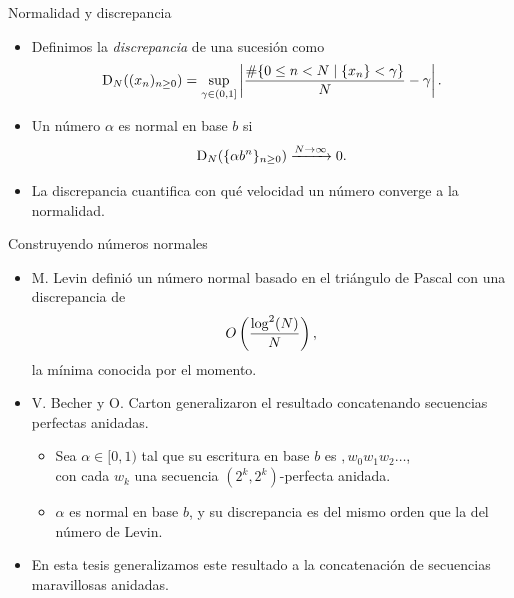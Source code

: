\documentclass[spanish,xcolor={table}]{beamer}
\begin{document}

\begin{frame}{Normalidad y discrepancia}

  \begin{itemize}
    \item Definimos la \emph{discrepancia} de una sucesión como
    \[
      \operatorname{D}_{N}((x_n)_{n \geq 0})
      = \sup_{\gamma \in (0,1]} \left\vert
        \frac{\# \lbrace 0 \leq n < N \;\vert\; \lbrace x_n \rbrace < \gamma \rbrace}
        {N} - \gamma
      \right\vert.
    \]
    \item Un número $\alpha$ es normal en base $b$ si
    \[ \operatorname{D}_{N}(\lbrace \alpha b^n \rbrace_{n\geq0})
    \xrightarrow{N \to \infty} 0. \]
    \item La discrepancia cuantifica con qué velocidad un número converge a
    la normalidad.
  \end{itemize}

\end{frame}


\begin{frame}{Construyendo números normales}
  \begin{itemize}
    \item M. Levin definió un número normal basado en el triángulo de Pascal
    con una discrepancia de
    \[ O \left(\frac{\log^2(N)}{N}\right), \]
    la mínima conocida por el momento.
    \pause
    \item V. Becher y O. Carton generalizaron el resultado concatenando
    secuencias perfectas anidadas.
    \begin{itemize}
      \item Sea $\alpha \in [0, 1)$ tal que su escritura en base $b$ es ${,}w_0 w_1 w_2 \dots$, \\ con cada $w_k$ una secuencia $(2^k,2^k)$-perfecta anidada.
      \item $\alpha$ es normal en base $b$,
      y su discrepancia es del mismo orden que la del número de Levin.
    \end{itemize}
    \pause
    \item En esta tesis generalizamos este resultado a la concatenación
    de secuencias maravillosas anidadas.
  \end{itemize}
\end{frame}
\end{document}
